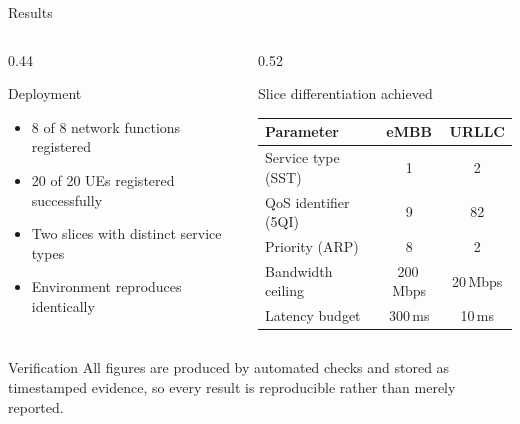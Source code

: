 \documentclass[aspectratio=169,11pt]{beamer}
\begin{document}
\begin{frame}{Results}
  \begin{columns}[T,onlytextwidth]
    \begin{column}{0.44\textwidth}
      \begin{block}{Deployment}
        \small
        \begin{itemize}
          \item 8 of 8 network functions registered
          \item 20 of 20 UEs registered successfully
          \item Two slices with distinct service types
          \item Environment reproduces identically
        \end{itemize}
      \end{block}
    \end{column}
    \begin{column}{0.52\textwidth}
      \begin{block}{Slice differentiation achieved}
        \scriptsize
        \renewcommand{\arraystretch}{1.2}
        \begin{tabular}{@{}lcc@{}}
          \toprule
          \textbf{Parameter} & \textbf{eMBB} & \textbf{URLLC}\\
          \midrule
          Service type (SST) & 1 & 2\\
          QoS identifier (5QI) & 9 & 82\\
          Priority (ARP) & 8 & 2\\
          Bandwidth ceiling & 200\,Mbps & 20\,Mbps\\
          Latency budget & 300\,ms & 10\,ms\\
          \bottomrule
        \end{tabular}
      \end{block}
    \end{column}
  \end{columns}
  \vfill
  \begin{block}{Verification}
    \small
    All figures are produced by automated checks and stored as timestamped
    evidence, so every result is reproducible rather than merely reported.
  \end{block}
\end{frame}
\end{document}
